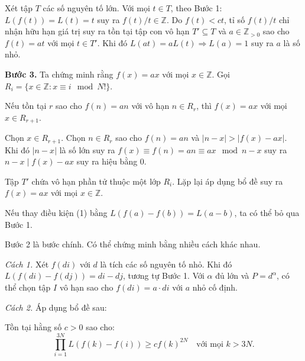 \begin{problem}
\begin{soln}
    Xét tập \( T \) các số nguyên tố lớn. Với mọi \( t \in T \), theo Bước 1: \( L(f(t)) = L(t) = t \) suy ra \( f(t)/t \in \mathbb{Z} \).
    Do \( f(t) < ct \), tỉ số \( f(t)/t \) chỉ nhận hữu hạn giá trị suy ra tồn tại tập con vô hạn \( T' \subseteq T \) và \( a \in \mathbb{Z}_{>0} \) 
    sao cho \( f(t) = at \) với mọi \( t \in T' \).
    Khi đó \( L(at) = aL(t) \Rightarrow L(a) = 1 \) suy ra \( a \) là số nhỏ.

    \textbf{Bước 3.} Ta chứng minh rằng \( f(x) = ax \) với mọi \( x \in \mathbb{Z} \).
    Gọi \( R_i = \{ x \in \mathbb{Z} : x \equiv i \mod N! \} \).
    \begin{claim*}
        Nếu tồn tại \( r \) sao cho \( f(n) = an \) với vô hạn \( n \in R_r \), thì \( f(x) = ax \) với mọi \( x \in R_{r+1} \).
    \end{claim*}
    \begin{subproof}
        Chọn \( x \in R_{r+1} \). Chọn \( n \in R_r \) sao cho \( f(n) = an \) và \( |n - x| > |f(x) - ax| \). 
        Khi đó \( |n - x| \) là số lớn suy ra \( f(x) \equiv f(n) = an \equiv ax \mod n - x \) suy ra \( n - x \mid f(x) - ax \) suy ra hiệu bằng 0.
    \end{subproof}

    Tập \( T' \) chứa vô hạn phần tử thuộc một lớp \( R_i \). Lặp lại áp dụng bổ đề suy ra \( f(x) = ax \) với mọi \( x \in \mathbb{Z} \).
\end{soln}

\begin{remark*}
    Nếu thay điều kiện (1) bằng \( L(f(a) - f(b)) = L(a - b) \), ta có thể bỏ qua Bước 1.
\end{remark*}

\begin{remark*}
    Bước 2 là bước chính. Có thể chứng minh bằng nhiều cách khác nhau.

    \textit{Cách 1.} Xét \( f(di) \) với \( d \) là tích các số nguyên tố nhỏ. Khi đó \( L(f(di) - f(dj)) = di - dj \), tương tự Bước 1.
    Với \( \alpha \) đủ lớn và \( P = d^\alpha \), có thể chọn tập \( I \) vô hạn sao cho \( f(di) = a \cdot di \) với \( a \) nhỏ cố định.

    \textit{Cách 2.} Áp dụng bổ đề sau:
    \begin{lemma*}
        Tồn tại hằng số \( c > 0 \) sao cho:
        \[
            \prod_{i=1}^{3N} L(f(k) - f(i)) \ge c f(k)^{2N} \quad \text{với mọi } k > 3N.
        \]
    \end{lemma*}


\end{remark*}
\end{problem}
